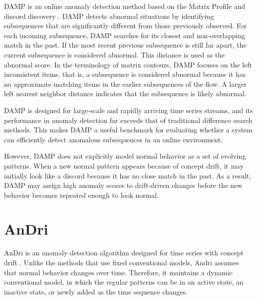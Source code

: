 DAMP is an online anomaly detection method based on the Matrix Profile and discord discovery \citep{lu2022damp}. DAMP detects abnormal situations by identifying subsequences that are significantly different from those previously observed. For each incoming subsequence, DAMP searches for its closest and non-overlapping match in the past. If the most recent previous subsequence is still far apart, the current subsequence is considered abnormal. This distance is used as the abnormal score. In the terminology of matrix contours, DAMP focuses on the left inconsistent items, that is, a subsequence is considered abnormal because it has no approximate matching items in the earlier subsequences of the flow. A larger left nearest neighbor distance indicates that the subsequence is likely abnormal.

DAMP is designed for large-scale and rapidly arriving time series streams, and its performance in anomaly detection far exceeds that of traditional difference search methods. This makes DAMP a useful benchmark for evaluating whether a system can efficiently detect anomalous subsequences in an online environment.

However, DAMP does not explicitly model normal behavior as a set of evolving patterns. When a new normal pattern appears because of concept drift, it may initially look like a discord because it has no close match in the past. As a result, DAMP may assign high anomaly scores to drift-driven changes before the new behavior becomes repeated enough to look normal.

\section{AnDri}

AnDri is an anomaly detection algorithm designed for time series with concept drift \citep{park2025andri,park2025adaptive}. Unlike the methods that use fixed conventional models, Andri assumes that normal behavior changes over time. Therefore, it maintains a dynamic conventional model, in which the regular patterns can be in an active state, an inactive state, or newly added as the time sequence changes.

